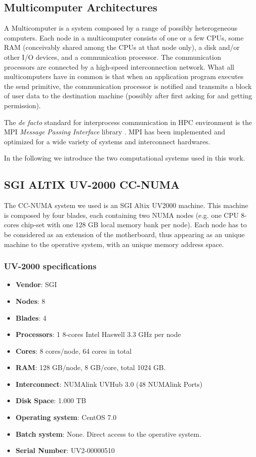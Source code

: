 \documentclass[a4paper,12pt]{article}
\begin{document}
\subsection{Multicomputer Architectures}
A Multicomputer is a system composed by a range of possibly heterogeneous computers.
Each node in a multicomputer consists of one or a few CPUs, some RAM (conceivably shared among the CPUs at that node only), a disk and/or other I/O devices, and a communication processor. 
The communication processors are connected by a high-speed interconnection network. 
What all multicomputers have in common is that when an application program executes the send primitive, the communication processor is notified and transmits a block of user data to the destination machine (possibly after first asking for and getting permission).

The \textit{de facto} standard for interprocess communication in HPC environment is the MPI \textit{Message Passing Interface} library \cite{MPI}.
MPI has been implemented and optimized for a wide variety of systems and interconnect hardwares.


In the following we introduce the two computational systems used in this work.



\subsection{SGI ALTIX UV-2000 CC-NUMA}\label{numaarch:sec}

The CC-NUMA system we used is an SGI Altix UV2000 machine.
This machine is composed by four blades, each containing two NUMA nodes (e.g. one CPU 8-cores chip-set with one 128 GB local memory bank per node). 
Each node has to be considered as an extension of the motherboard, thus appearing as an unique machine to the operative system, with an unique memory address space.

\subsubsection{UV-2000 specifications}

\begin{itemize}
\item \textbf{Vendor}: SGI
\item \textbf{Nodes}: 8
\item \textbf{Blades}: 4
\item \textbf{Processors}: 1 8-cores Intel Haswell 3.3 GHz per node
\item \textbf{Cores}: 8 cores/node, 64 cores in total
\item \textbf{RAM}: 128 GB/node, 8 GB/core, total 1024 GB.
\item \textbf{Interconnect}: NUMAlink UVHub 3.0 (48 NUMAlink Ports)
\item \textbf{Disk Space}: 1.000 TB
\item \textbf{Operating system}: CentOS 7.0
\item \textbf{Batch system}: None. Direct access to the operative system.
\item \textbf{Serial Number}: UV2-00000510
\end{itemize}
\end{document}
